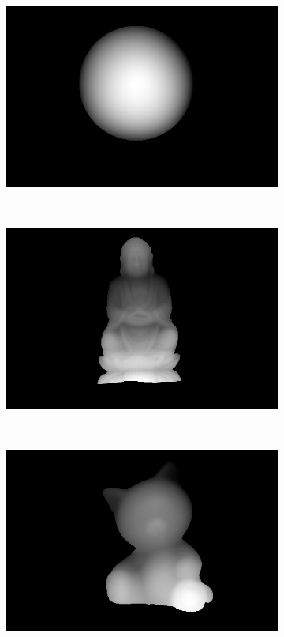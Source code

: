 \documentclass{paper}
\begin{document}
\begin{figure}[h!]
    \centering
    \begin{subfigure}{0.3\textwidth}
        \includegraphics[width=\textwidth]{results/gray/gray_depthmap}
    \end{subfigure}
    ~
    \begin{subfigure}{0.3\textwidth}
        \includegraphics[width=\textwidth]{results/buddha/buddha_depthmap}
    \end{subfigure}
    ~
    \begin{subfigure}{0.3\textwidth}
        \includegraphics[width=\textwidth]{results/cat/cat_depthmap}
    \end{subfigure}
    

\end{figure}
\end{document}
